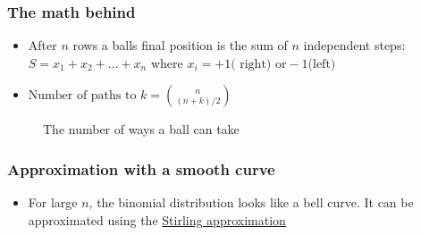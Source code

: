 \documentclass[
  a4paper,
]{scrbook}
\providecommand{\tightlist}{%
  \setlength{\itemsep}{0pt}\setlength{\parskip}{0pt}}\usepackage{longtable,booktabs,array}
\begin{document}
\subsubsection{The math behind}\label{the-math-behind}

\begin{itemize}
\tightlist
\item
  After \(n\) rows a balls final position is the sum of \(n\)
  independent steps: \(S = x_1 + x_2 + \ldots + x_n\) where
  \(x_i = +1 \text{( right) or}  -1 \text{(left)}\)
\item
  \(\text{Number of paths to } k = \binom{n}{(n + k)/2}\)
\end{itemize}

\begin{figure}[ht]


\caption{\label{fig-galtonboard-dist}The number of ways a ball can take}

\end{figure}%

\subsubsection{Approximation with a smooth
curve}\label{approximation-with-a-smooth-curve}

\begin{itemize}
\tightlist
\item
  For large \(n\), the binomial distribution looks like a bell curve. It
  can be approximated using the
  \href{https://planetmath.org/StirlingsApproximation}{Stirling
  approximation}
\end{itemize}
\end{document}
